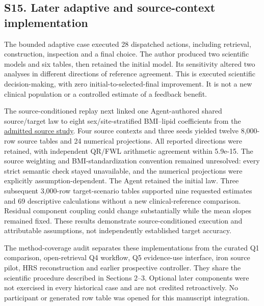 \documentclass[11pt,letterpaper]{article}
\begin{document}
\endgroup

\subsection*{S15. Later adaptive and source-context implementation}

The bounded adaptive case executed 28 dispatched actions, including retrieval, construction, inspection and a final choice. The author produced two scientific models and six tables, then retained the initial model. Its sensitivity altered two analyses in different directions of reference agreement. This is executed scientific decision-making, with zero initial-to-selected-final improvement. It is not a new clinical population or a controlled estimate of a feedback benefit.


The source-conditioned replay next linked one Agent-authored shared source/\allowbreak{}target law to eight sex/\allowbreak{}site-stratified BMI–\allowbreak{}lipid coefficients from the \href{https://doi.org/10.1136/bmjgh-2019-001542}{admitted source study}. Four source contexts and three seeds yielded twelve 8,000-row source tables and 24 numerical projections. All reported directions were retained, with independent QR/\allowbreak{}FWL arithmetic agreement within 5.9e-15. The source weighting and BMI-standardization convention remained unresolved: every strict semantic check stayed unavailable, and the numerical projections were explicitly assumption-dependent. The Agent retained the initial law. Three subsequent 3,000-row target-scenario tables supported nine requested estimates and 69 descriptive calculations without a new clinical-reference comparison. Residual component coupling could change substantially while the mean slopes remained fixed. These results demonstrate source-conditioned execution and attributable assumptions, not independently established target accuracy.


The method-coverage audit separates these implementations from the curated Q1 comparison, open-retrieval Q4 workflow, Q5 evidence-use interface, iron source pilot, HRS reconstruction and earlier prospective controller. They share the scientific procedure described in Sections 2–\allowbreak{}3. Optional later components were not exercised in every historical case and are not credited retroactively. No participant or generated row table was opened for this manuscript integration.
\end{document}
